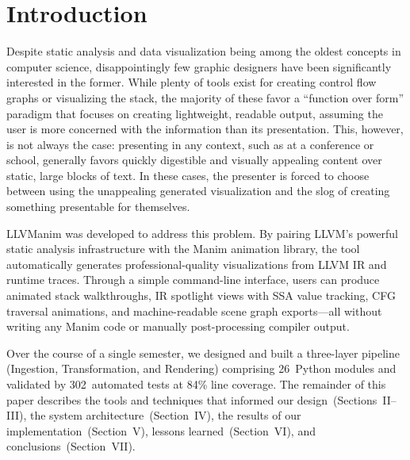 \section{Introduction}
Despite static analysis and data visualization being among the oldest concepts in computer science, disappointingly few graphic designers have been significantly interested in the former. While plenty of tools exist for creating control flow graphs or visualizing the stack, the majority of these favor a ``function over form'' paradigm that focuses on creating lightweight, readable output, assuming the user is more concerned with the information than its presentation. This, however, is not always the case: presenting in any context, such as at a conference or school, generally favors quickly digestible and visually appealing content over static, large blocks of text. In these cases, the presenter is forced to choose between using the unappealing generated visualization and the slog of creating something presentable for themselves.

LLVManim was developed to address this problem. By pairing LLVM's powerful static analysis infrastructure with the Manim animation library, the tool automatically generates professional-quality visualizations from LLVM IR and runtime traces. Through a simple command-line interface, users can produce animated stack walkthroughs, IR spotlight views with SSA value tracking, CFG traversal animations, and machine-readable scene graph exports---all without writing any Manim code or manually post-processing compiler output.

Over the course of a single semester, we designed and built a three-layer pipeline (Ingestion, Transformation, and Rendering) comprising 26~Python modules and validated by 302~automated tests at 84\% line coverage. The remainder of this paper describes the tools and techniques that informed our design~(Sections~II--III), the system architecture~(Section~IV), the results of our implementation~(Section~V), lessons learned~(Section~VI), and conclusions~(Section~VII).
